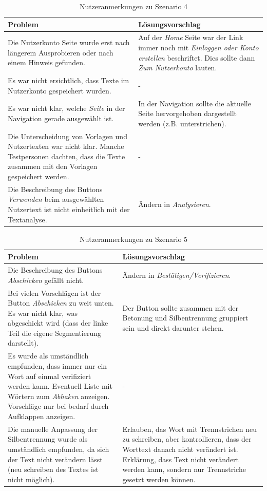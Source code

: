 \begin{table}[h!]
	\centering
	\begin{tabular}{|p{}|p{}|}
		\hline
		\textbf{Problem} & \textbf{Lösungsvorschlag}\\
		\hline
		\hline
		Die Nutzerkonto Seite wurde erst nach längerem Ausprobieren oder nach einem Hinweis gefunden. & Auf der \textit{Home} Seite war der Link immer noch mit \textit{Einloggen oder Konto erstellen} beschriftet. Dies sollte dann \textit{Zum Nutzerkonto} lauten.\\
		\hline
		Es war nicht ersichtlich, dass Texte im Nutzerkonto gespeichert wurden. & -\\
		\hline
		Es war nicht klar, welche \textit{Seite} in der Navigation gerade ausgewählt ist. & In der Navigation sollte die aktuelle Seite hervorgehoben dargestellt werden (z.B. unterstrichen).\\
		\hline
		Die Unterscheidung von Vorlagen und Nutzertexten war nicht klar. Manche Testpersonen dachten, dass die Texte zusammen mit den Vorlagen gespeichert werden. & -\\
		\hline
		Die Beschreibung des Buttons \textit{Verwenden} beim ausgewählten Nutzertext ist nicht einheitlich mit der Textanalyse. & Ändern in \textit{Analysieren}.\\
		\hline
	\end{tabular}
	\caption{Nutzeranmerkungen zu Szenario 4}
	\label{table:szenario4}
\end{table}


\begin{table}[h!]
	\centering
	\begin{tabular}{|p{}|p{}|}
		\hline
		\textbf{Problem} & \textbf{Lösungsvorschlag}\\
		\hline
		\hline
		Die Beschreibung des Buttons \textit{Abschicken} gefällt nicht. & Ändern in \textit{Bestätigen/Verifizieren}.\\
		\hline
		Bei vielen Vorschlägen ist der Button \textit{Abschicken} zu weit unten. Es war nicht klar, was abgeschickt wird (dass der linke Teil die eigene Segmentierung darstellt). & Der Button sollte zusammen mit der Betonung und Silbentrennung gruppiert sein und direkt darunter stehen.\\
		\hline
		Es wurde als umständlich empfunden, dass immer nur ein Wort auf einmal verifiziert werden kann.
		Eventuell Liste mit Wörtern zum \textit{Abhaken} anzeigen. Vorschläge nur bei bedarf durch Aufklappen anzeigen.
		& -\\
		\hline
		Die manuelle Anpassung der Silbentrennung wurde als umständlich empfunden, da sich der Text nicht verändern lässt (neu schreiben des Textes ist nicht möglich). & Erlauben, das Wort mit Trennstrichen neu zu schreiben, aber kontrollieren, dass der Worttext danach nicht verändert ist.
		Erklärung, dass Text nicht verändert werden kann, sondern nur Trennstriche gesetzt werden können.\\
		\hline
	\end{tabular}
	\caption{Nutzeranmerkungen zu Szenario 5}
	\label{table:szenario5}
\end{table}